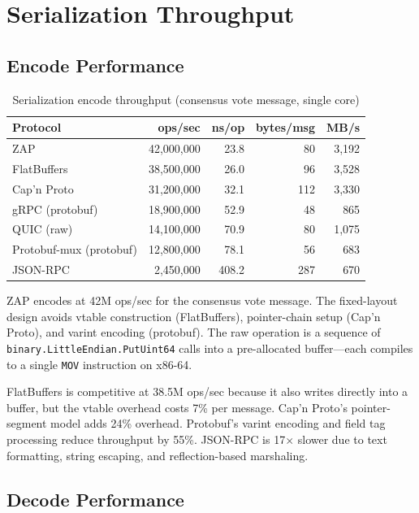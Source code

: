 \section{Serialization Throughput}


\subsection{Encode Performance}

\begin{table}[h]
\centering
\caption{Serialization encode throughput (consensus vote message, single core)}
\label{tab:encode}
\begin{tabular}{lrrrr}
\toprule
\textbf{Protocol} & \textbf{ops/sec} & \textbf{ns/op} & \textbf{bytes/msg} & \textbf{MB/s} \\
\midrule
\rowcolor{luxblue!10}
ZAP & 42,000,000 & 23.8 & 80 & 3,192 \\
FlatBuffers & 38,500,000 & 26.0 & 96 & 3,528 \\
Cap'n Proto & 31,200,000 & 32.1 & 112 & 3,330 \\
gRPC (protobuf) & 18,900,000 & 52.9 & 48 & 865 \\
QUIC (raw) & 14,100,000 & 70.9 & 80 & 1,075 \\
Protobuf-mux (protobuf) & 12,800,000 & 78.1 & 56 & 683 \\
JSON-RPC & 2,450,000 & 408.2 & 287 & 670 \\
\bottomrule
\end{tabular}
\end{table}

ZAP encodes at 42M ops/sec for the consensus vote message. The fixed-layout design avoids vtable construction (FlatBuffers), pointer-chain setup (Cap'n Proto), and varint encoding (protobuf). The raw operation is a sequence of \texttt{binary.LittleEndian.PutUint64} calls into a pre-allocated buffer---each compiles to a single \texttt{MOV} instruction on x86-64.

FlatBuffers is competitive at 38.5M ops/sec because it also writes directly into a buffer, but the vtable overhead costs 7\% per message. Cap'n Proto's pointer-segment model adds 24\% overhead. Protobuf's varint encoding and field tag processing reduce throughput by 55\%. JSON-RPC is 17$\times$ slower due to text formatting, string escaping, and reflection-based marshaling.

\subsection{Decode Performance}


